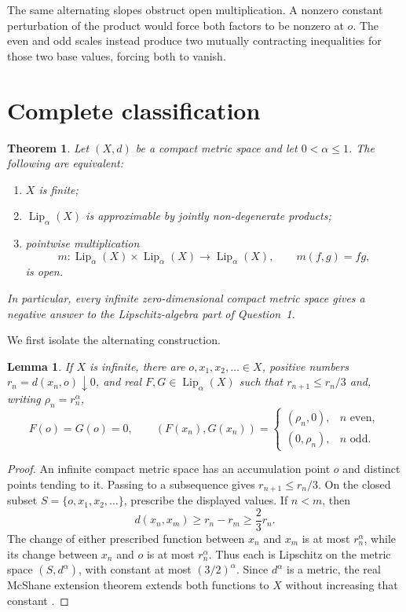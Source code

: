 \documentclass[11pt]{article}
\newtheorem{theorem}{Theorem}
\newtheorem{lemma}{Lemma}
\newcommand{\Lip}{\operatorname{Lip}}
\begin{document}
The same alternating slopes obstruct open multiplication.  A nonzero constant
perturbation of the product would force both factors to be nonzero at $o$.
The even and odd scales instead produce two mutually contracting inequalities
for those two base values, forcing both to vanish.

\section{Complete classification}

\begin{theorem}\label{thm:main}
Let $(X,d)$ be a compact metric space and let $0<\alpha\le1$.  The following
are equivalent:
\begin{enumerate}
\item $X$ is finite;
\item $\Lip_\alpha(X)$ is approximable by jointly non-degenerate products;
\item pointwise multiplication
\[
m:\Lip_\alpha(X)\times\Lip_\alpha(X)\longrightarrow\Lip_\alpha(X),
\qquad m(f,g)=fg,
\]
is open.
\end{enumerate}
In particular, every infinite zero-dimensional compact metric space gives a
negative answer to the Lipschitz-algebra part of Question~1.
\end{theorem}

We first isolate the alternating construction.

\begin{lemma}\label{lem:alternating}
If $X$ is infinite, there are $o,x_1,x_2,\ldots\in X$, positive numbers
$r_n=d(x_n,o)\downarrow0$, and real $F,G\in\Lip_\alpha(X)$ such that
$r_{n+1}\le r_n/3$ and, writing $\rho_n=r_n^\alpha$,
\[
F(o)=G(o)=0,
\qquad
(F(x_n),G(x_n))=
\begin{cases}
(\rho_n,0),&n\text{ even},\\
(0,\rho_n),&n\text{ odd}.
\end{cases}
\]
\end{lemma}

\begin{proof}
An infinite compact metric space has an accumulation point $o$ and distinct
points tending to it.  Passing to a subsequence gives
$r_{n+1}\le r_n/3$.  On the closed subset
$S=\{o,x_1,x_2,\ldots\}$, prescribe the displayed values.  If $n<m$, then
\[
d(x_n,x_m)\ge r_n-r_m\ge\frac23r_n.
\]
The change of either prescribed function between $x_n$ and $x_m$ is at most
$r_n^\alpha$, while its change between $x_n$ and $o$ is at most
$r_n^\alpha$.  Thus each is Lipschitz on the metric space $(S,d^\alpha)$,
with constant at most $(3/2)^\alpha$.  Since $d^\alpha$ is a metric, the real
McShane extension theorem extends both functions to $X$ without increasing
that constant \cite{mcshane}.
\end{proof}
\end{document}
